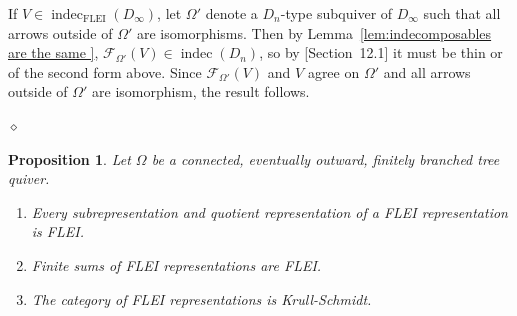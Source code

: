 \documentclass{article}
\newtheorem{proposition}{Proposition}[section]
\newenvironment{proof}{\vspace*{2ex}\noindent {\em Proof:}
}{\hfill $\diamond$ \\[2ex]}
\begin{document}
\begin{proof}
If $V \in \operatorname{indec}_{\text{FLEI}}(D_\infty)$, let $\Omega'$ denote a $D_n$-type subquiver of $D_\infty$ such that all arrows outside of $\Omega'$ are isomorphisms. Then by Lemma~\ref{lem:indecomposables are the same }, $\mathscr{F}_{\Omega'}(V) \in \operatorname{indec}(D_n)$, so by \cite{Humphreys72}[Section~12.1] it must be thin or of the second form above. Since $\mathscr{F}_{\Omega'}(V)$ and $V$ agree on $\Omega'$ and all arrows outside of $\Omega'$ are isomorphism, the result follows. 



\end{proof}




\begin{proposition} \label{prop: flei closed under sums and quotients and krull-schmidt}
Let $\Omega$ be a connected, eventually outward, finitely branched tree quiver. 
\begin{enumerate}
    \item  Every subrepresentation and quotient representation of a FLEI representation is FLEI. 
    
    \item Finite sums of FLEI representations are FLEI. 

    \item The category of FLEI representations is Krull-Schmidt.

    
\end{enumerate}

\end{proposition}
\end{document}
